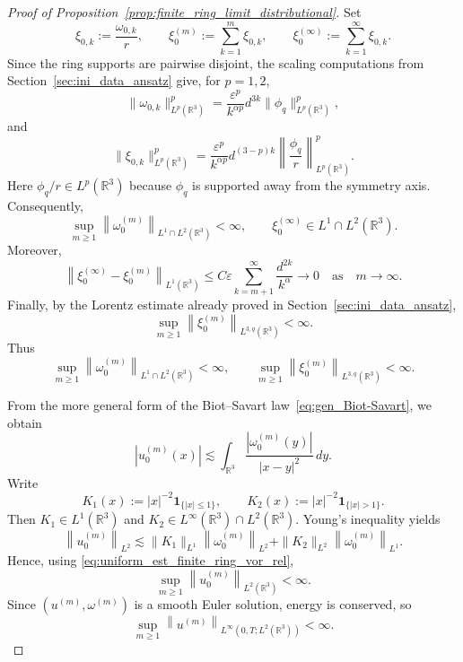 \documentclass[reqno,11pt]{amsart}
\begin{document}
\begin{proof}[Proof of Proposition~\ref{prop:finite_ring_limit_distributional}]
Set
\[
\xi_{0,k}:=\frac{\omega_{0,k}}{r},
\qquad
\xi_0^{(m)}:=\sum_{k=1}^m \xi_{0,k},
\qquad
\xi_0^{(\infty)}:=\sum_{k=1}^\infty \xi_{0,k}.
\]
Since the ring supports are pairwise disjoint, the scaling computations from
Section~\ref{sec:ini_data_ansatz} give, for \(p=1,2\),
\[
\|\omega_{0,k}\|_{L^p(\mathbb R^3)}^p
=
\frac{\varepsilon^p}{k^{\alpha p}}
d^{3k}\|\phi_q\|_{L^p(\mathbb R^3)}^p,
\]
and
\[
\|\xi_{0,k}\|_{L^p(\mathbb R^3)}^p
=
\frac{\varepsilon^p}{k^{\alpha p}}
d^{(3-p)k}
\left\|\frac{\phi_q}{r}\right\|_{L^p(\mathbb R^3)}^p.
\]
Here \(\phi_q/r\in L^p(\mathbb R^3)\) because \(\phi_q\) is supported away from the symmetry axis.
Consequently,
\[
\sup_{m\ge1}
\left\|\omega_0^{(m)}\right\|_{L^1\cap L^2(\mathbb R^3)}
<\infty,
\qquad
\xi_0^{(\infty)}\in L^1\cap L^2(\mathbb R^3).
\]
Moreover,
\[
\left\|\xi_0^{(\infty)}-\xi_0^{(m)}\right\|_{L^1(\mathbb R^3)}
\le
C\varepsilon
\sum_{k=m+1}^\infty
\frac{d^{2k}}{k^\alpha}
\to 0 \quad \text{as}\quad m\to\infty.
\]
Finally, by the Lorentz estimate already proved in Section~\ref{sec:ini_data_ansatz},
\[
\sup_{m\ge1}
\left\|\xi_0^{(m)}\right\|_{L^{3,q}(\mathbb R^3)}
<\infty.
\]
Thus
\begin{equation}
\label{eq:uniform_est_finite_ring_vor_rel}
\sup_{m\ge 1}\left\|\omega_0^{(m)}\right\|_{L^1\cap L^2(\mathbb{R}^3)}<\infty,
\qquad
\sup_{m\ge 1}\left\|\xi_0^{(m)}\right\|_{L^{3,q}(\mathbb{R}^3)}<\infty.
\end{equation}


From the more general form of the Biot--Savart law~\eqref{eq:gen_Biot-Savart},
we obtain
\[
\left|u_0^{(m)}(x)\right|
\lesssim
\int_{\mathbb{R}^3}\frac{\left|\omega_0^{(m)}(y)\right|}{|x-y|^2}\,dy.
\]
Write
\[
K_1(x):=|x|^{-2}\mathbf 1_{\big\{|x|\le 1\big\}},
\qquad
K_2(x):=|x|^{-2}\mathbf 1_{\big\{|x|>1\big\}}.
\]
Then \(K_1\in L^1(\mathbb{R}^3)\) and \(K_2\in L^\infty(\mathbb{R}^3)\cap L^2(\mathbb{R}^3)\).
Young's inequality yields
\[
\left\|u_0^{(m)}\right\|_{L^2}
\lesssim
\|K_1\|_{L^1} \left\|\omega_0^{(m)} \right\|_{L^2}
+\|K_2\|_{L^2}\left\|\omega_0^{(m)}\right\|_{L^1}.
\]
Hence, using \eqref{eq:uniform_est_finite_ring_vor_rel},
\[
\sup_{m\ge 1}\left\|u_0^{(m)}\right\|_{L^2(\mathbb{R}^3)}<\infty.
\]
Since \((u^{(m)},\omega^{(m)})\) is a smooth Euler solution, energy is conserved, so
\begin{equation}
\sup_{m\ge 1}\left\|u^{(m)}\right\|_{L^\infty(0,T;L^2(\mathbb{R}^3))}<\infty.
\label{eq:finite_ring_energy_bd}
\end{equation}


\end{proof}
\end{document}
